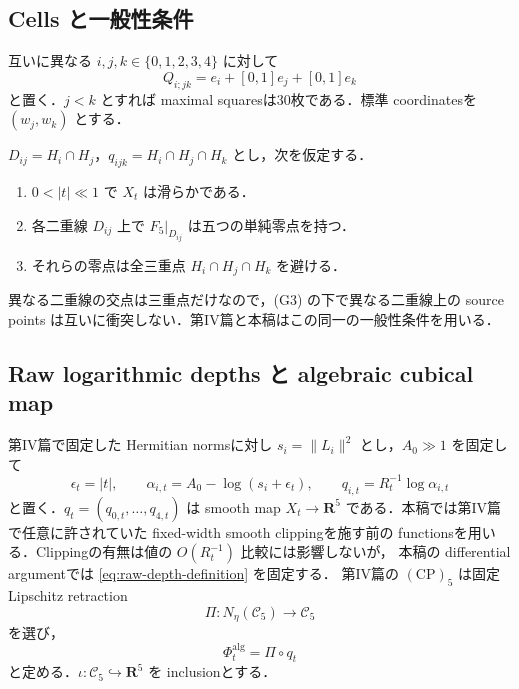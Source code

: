 \documentclass[a4paper,11pt]{ltjsarticle}
\numberwithin{equation}{section}
\theoremstyle{plain}
\theoremstyle{definition}
\theoremstyle{remark}
\newcommand{\RR}{\mathbf R}
\newcommand{\cC}{\mathcal C}
\begin{document}
\subsection{Cells と一般性条件}

互いに異なる $i,j,k\in\{0,1,2,3,4\}$ に対して
\begin{equation}\label{eq:Qijk-input}
 Q_{i;jk}=e_i+[0,1]e_j+[0,1]e_k
\end{equation}
と置く．$j<k$ とすれば maximal squaresは30枚である．標準 coordinatesを $(w_j,w_k)$ とする．

$D_{ij}=H_i\cap H_j$，$q_{ijk}=H_i\cap H_j\cap H_k$ とし，次を仮定する．
\begin{enumerate}[label=\textup{(G\arabic*)}]
\item $0<|t|\ll1$ で $X_t$ は滑らかである．
\item 各二重線 $D_{ij}$ 上で $F_5|_{D_{ij}}$ は五つの単純零点を持つ．
\item それらの零点は全三重点 $H_i\cap H_j\cap H_k$ を避ける．
\end{enumerate}
異なる二重線の交点は三重点だけなので，\textup{(G3)} の下で異なる二重線上の source points は互いに衝突しない．第IV篇と本稿はこの同一の一般性条件を用いる．

\subsection{Raw logarithmic depths と algebraic cubical map}

第IV篇で固定した Hermitian normsに対し $s_i=\|L_i\|^2$ とし，$A_0\gg1$ を固定して
\begin{equation}\label{eq:raw-depth-definition}
 \epsilon_t=|t|,\qquad
 \alpha_{i,t}=A_0-\log(s_i+\epsilon_t),\qquad
 q_{i,t}=R_t^{-1}\log\alpha_{i,t}
\end{equation}
と置く．$q_t=(q_{0,t},\ldots,q_{4,t})$ は smooth map $X_t\to\RR^5$ である．本稿では第IV篇で任意に許されていた
fixed-width smooth clippingを施す前の functionsを用いる．Clippingの有無は値の $O(R_t^{-1})$ 比較には影響しないが，
本稿の differential argumentでは \eqref{eq:raw-depth-definition} を固定する．
第IV篇の $\mathrm{(CP)}_5$ は固定 Lipschitz retraction
\[
 \Pi:N_\eta(\cC_5)\longrightarrow\cC_5
\]
を選び，
\begin{equation}\label{eq:alg-map-raw}
 \Phi_t^{\mathrm{alg}}=\Pi\circ q_t
\end{equation}
と定める．$\iota:\cC_5\hookrightarrow\RR^5$ を inclusionとする．
\end{document}
